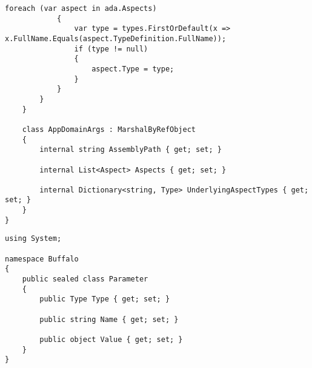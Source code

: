 \begin{lstlisting}[caption={../buffalo/Weaver.cs}, label=../buffalo/Weaver.cs, frame=tb, basicstyle=\scriptsize]
            foreach (var aspect in ada.Aspects)
            {
                var type = types.FirstOrDefault(x => x.FullName.Equals(aspect.TypeDefinition.FullName));
                if (type != null)
                {
                    aspect.Type = type;
                }
            }
        }
    }

    class AppDomainArgs : MarshalByRefObject
    {
        internal string AssemblyPath { get; set; }

        internal List<Aspect> Aspects { get; set; }

        internal Dictionary<string, Type> UnderlyingAspectTypes { get; set; }
    }
}\end{lstlisting}

\begin{lstlisting}[caption={../buffalo/Parameter.cs}, label=../buffalo/Parameter.cs, frame=tb, basicstyle=\scriptsize]﻿using System;

namespace Buffalo
{
    public sealed class Parameter
    {
        public Type Type { get; set; }

        public string Name { get; set; }

        public object Value { get; set; }
    }
}
\end{lstlisting}

